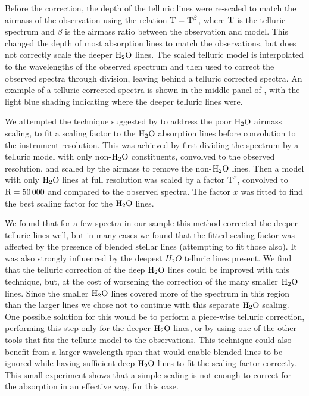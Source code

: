 Before the correction, the depth of the telluric lines were re-scaled to match the airmass of the observation using the relation \(\rm T = T^{\beta} \), where \(\rm T\) is the telluric spectrum and \(\beta \) is the airmass ratio between the observation and model. This changed the depth of most absorption lines to match the observations, but does not correctly scale the deeper \(\rm H_{2}O \) lines. The scaled telluric model is interpolated to the wavelengths of the observed spectrum and then used to correct the observed spectra through division, leaving behind a telluric corrected spectra. An example of a telluric corrected spectra is shown in the middle panel of , with the light blue shading indicating where the deeper telluric lines were.

We attempted the technique suggested by \citet{bertaux_tapas_2014} to address the poor \(\rm H_{2}O \) airmass scaling, to fit a scaling factor to the \(\rm {H}_{2}O \) absorption lines before convolution to the instrument resolution. This was achieved by first dividing the spectrum by a telluric model with only non-\(\rm H_{2}O \) constituents, convolved to the observed resolution, and scaled by the airmass to remove the non-\(\rm H_{2}O \) lines. Then a model with only \(\rm H_{2}O \) lines at full resolution was scaled by a factor \(\textrm{T}^{x} \), convolved to \(\rm R=50\,000 \) and compared to the observed spectra. The factor \(x \) was fitted to find the best scaling factor for the \(\rm H_{2}O \) lines.

We found that for a few spectra in our sample this method corrected the deeper telluric lines well, but in many cases we found that the fitted scaling factor was affected by the presence of blended stellar lines (attempting to fit those also). It was also strongly influenced by the deepest \(H_{2}O\) telluric lines present. We find that the telluric correction of the deep \(\rm H_{2}O \) lines could be improved with this technique, but, at the cost of worsening the correction of the many smaller \(\rm H_{2}O \) lines. Since the smaller \(\rm H_{2}O \) lines covered more of the spectrum in this region than the larger lines we chose not to continue with this separate \(\rm H_{2}O \) scaling. One possible solution for this would be to perform a piece-wise telluric correction, performing this step only for the deeper \( \rm H_{2}O\) lines, or by using one of the other tools that fits the telluric model to the observations. This technique could also benefit from a larger wavelength span that would enable blended lines to be ignored while having sufficient deep \(\rm H_{2}O\) lines to fit the scaling factor correctly. This small experiment shows that a simple scaling is not enough to correct for the absorption in an effective way, for this case.

